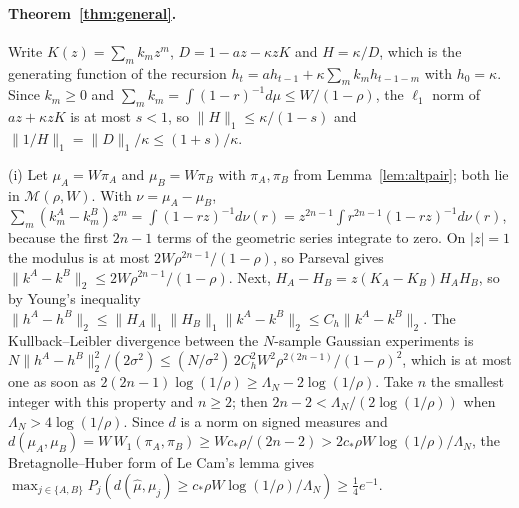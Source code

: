 \documentclass[12pt]{article}
\theoremstyle{definition}
\theoremstyle{remark}
\begin{document}
\paragraph{Theorem~\ref{thm:general}.} Write $K(z)=\sum_mk_mz^m$, $D=1-az-\kappa zK$ and $H=\kappa/D$, which is the generating function of the recursion $h_t=ah_{t-1}+\kappa\sum_mk_mh_{t-1-m}$ with $h_0=\kappa$. Since $k_m\ge0$ and $\sum_mk_m=\int(1-r)^{-1}d\mu\le W/(1-\rho)$, the $\ell_1$ norm of $az+\kappa zK$ is at most $s<1$, so $\|H\|_1\le\kappa/(1-s)$ and $\|1/H\|_1=\|D\|_1/\kappa\le(1+s)/\kappa$.

(i) Let $\mu_A=W\pi_A$ and $\mu_B=W\pi_B$ with $\pi_A,\pi_B$ from Lemma~\ref{lem:altpair}; both lie in $\mathcal M(\rho,W)$. With $\nu=\mu_A-\mu_B$, $\sum_m(k^A_m-k^B_m)z^m=\int(1-rz)^{-1}d\nu(r)=z^{2n-1}\int r^{2n-1}(1-rz)^{-1}d\nu(r)$, because the first $2n-1$ terms of the geometric series integrate to zero. On $|z|=1$ the modulus is at most $2W\rho^{2n-1}/(1-\rho)$, so Parseval gives $\|k^A-k^B\|_2\le2W\rho^{2n-1}/(1-\rho)$. Next, $H_A-H_B=z(K_A-K_B)H_AH_B$, so by Young's inequality $\|h^A-h^B\|_2\le\|H_A\|_1\|H_B\|_1\|k^A-k^B\|_2\le C_h\|k^A-k^B\|_2$. The Kullback--Leibler divergence between the $N$-sample Gaussian experiments is $N\|h^A-h^B\|_2^2/(2\sigma^2)\le(N/\sigma^2)\,2C_h^2W^2\rho^{2(2n-1)}/(1-\rho)^2$, which is at most one as soon as $2(2n-1)\log(1/\rho)\ge\Lambda_N-2\log(1/\rho)$. Take $n$ the smallest integer with this property and $n\ge2$; then $2n-2<\Lambda_N/(2\log(1/\rho))$ when $\Lambda_N>4\log(1/\rho)$. Since $d$ is a norm on signed measures and $d(\mu_A,\mu_B)=W\,W_1(\pi_A,\pi_B)\ge Wc_*\rho/(2n-2)>2c_*\rho W\log(1/\rho)/\Lambda_N$, the Bretagnolle--Huber form of Le Cam's lemma \citep[Lemma 2.6 and Theorem 2.2]{tsybakov2009} gives $\max_{j\in\{A,B\}}P_j(d(\hat\mu,\mu_j)\ge c_*\rho W\log(1/\rho)/\Lambda_N)\ge\tfrac14e^{-1}$.
\end{document}
